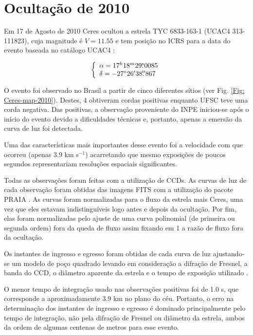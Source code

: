 \documentclass[12pt,a4paper]{monografia}
\newcommand{\degr}{\ensuremath{^{\circ}}}%
\newcommand{\arcmin}{\ensuremath{^{\prime}}}%
\newcommand{\fs}{\mbox{\ensuremath{.\!\!^s}}}
\newcommand{\farcs}{\mbox{\ensuremath{.\!\!^{\prime\prime}}}}%
\begin{document}
\section{Ocultação de 2010}
\label{Subsec: 2010-occ}

\indent \indent Em 17 de Agosto de 2010 Ceres ocultou a estrela TYC 6833-163-1 (UCAC4 313-111823), cuja magnitude é $V = 11.55$ e tem posição no ICRS para a data do evento baseada no catálogo UCAC4 \citep{Zacharias2013}:

\begin{equation}
\left\{ 
  \begin{array}{l l}
    \alpha = 17^{h}18^{m}29\fs 0085\\
    \delta = -27\degr 26\arcmin 38\farcs 867
  \end{array}
\right.
\label{Eq: 2010-coord}
\end{equation}

\indent O evento foi observado no Brasil a partir de cinco diferentes sítios (ver Fig. \ref{Fig: Ceres-map-2010}). Destes, 4 obtiveram cordas positivas enquanto UFSC teve uma corda negativa. Das positivas, a observação proveniente do INPE iniciou-se após o início do evento devido a dificuldades técnicas e, portanto, apenas a emersão da curva de luz foi detectada.

Uma das características mais importantes desse evento foi a velocidade com que ocorreu (apenas 3.9 km s$^{-1}$) acarretando que mesmo exposições de poucos segundos representariam resoluções espaciais significantes.

Todas as observações foram feitas com a utilização de CCDs. As curvas de luz de cada observação foram obtidas das imagens FITS com a utilização do pacote PRAIA \citep[Plataforma de Redução Astrométrica de Imagens Astronômicas,][]{Assafin2011}. As curvas foram normalizadas para o fluxo da estrela mais Ceres, uma vez que eles estavam indistinguíveis logo antes e depois da ocultação. Por fim, elas foram normalizadas pelo ajuste de uma curva polinomial (de primeira ou segunda ordem) fora da queda de fluxo assim fixando em 1 a razão de fluxo fora da ocultação.

Os instantes de ingresso e egresso foram obtidas de cada curva de luz ajustando-se um modelo de poço quadrado levando em consideração a difração de Fresnel, a banda do CCD, o diâmetro aparente da estrela e o tempo de exposição utilizado \citep[ver][]{Widemann2009, Braga-Ribas2013}.

O menor tempo de integração usado nas observações positivas foi de 1.0 s, que corresponde a aproximadamente 3.9 km no plano do céu. Portanto, o erro na determinação dos instantes de ingresso e egresso é dominado principalmente pelo tempo de integração, não pela difração de Fresnel ou diâmetro da estrela, ambos da ordem de algumas centenas de metros para esse evento.
\end{document}

